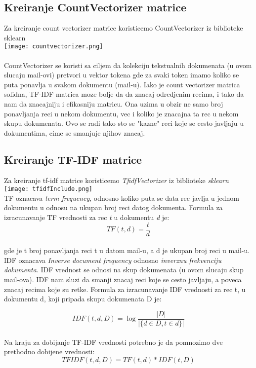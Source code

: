 \documentclass{article}
\begin{document}
\subsection{Kreiranje CountVectorizer matrice}
Za kreiranje count vectorizer matrice koristicemo CountVectorizer iz biblioteke sklearn
\\

\texttt{[image: countvectorizer.png]}\\
\\
CountVectorizer se koristi sa ciljem da kolekciju tekstualnih dokumenata (u ovom slucaju mail-ovi) pretvori u vektor tokena gde za svaki token imamo koliko se puta ponavlja u svakom dokumentu (mail-u).
Iako je count vectorizer matrica solidna, TF-IDF matrica moze bolje da da znacaj odredjenim recima, i tako da nam da znacajniju i efikasniju matricu. Ona uzima u obzir ne samo broj ponavljanja reci u nekom dokumentu, vec i koliko je znacajna ta rec u nekom skupu dokumenata. Ovo se radi tako sto se "kazne" reci koje se cesto javljaju u dokumentima, cime se smanjuje njihov znacaj.

\newpage
\subsection{Kreiranje TF-IDF matrice}
Za kreiranje tf-idf matrice koristicemo \textit{TfidfVectorizer} iz biblioteke \textit{sklearn}\\

\texttt{[image: tfidfInclude.png]}\\
TF oznacava \textit{term frequency}, odnosno koliko puta se data rec javlja u jednom dokumentu u odnosu na ukupan broj reci datog dokumenta. Formula za izracunavanje TF vrednosti za rec \textit{t} u dokumentu \textit{d} je:\\

$$TF(t,d) = \frac{t}{d}$$\\
gde je t broj ponavljanja reci t u datom mail-u, a d je ukupan broj reci u mail-u.\\ 
IDF oznacava \textit{Inverse document frequency} odnosno \textit{inverznu frekvenciju dokumenta}.
IDF vrednost se odnosi na skup dokumenata (u ovom slucaju skup mail-ova). IDF nam sluzi da smanji znacaj reci koje se cesto javljaju, a poveca znacaj recima koje su retke. Formula za izracunavanje IDF vrednosti za rec t, u dokumentu d, koji pripada skupu dokumenata D je:

$$ IDF(t,d,D) = \log\frac{|D|}{|\{d\in D, t \in d\}|} $$\\
Na kraju za dobijanje TF-IDF vrednosti potrebno je da pomnozimo dve prethodno dobijene vrednosti:
$$TFIDF(t,d,D) = TF(t,d) * IDF(t,D)$$
\end{document}
